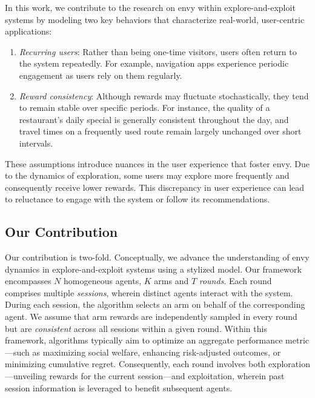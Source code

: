 In this work, we contribute to the research on envy within explore-and-exploit systems by modeling two key behaviors that characterize real-world, user-centric applications:
\begin{enumerate}[wide, labelwidth=0pt, labelindent=0pt]
    \item \textit{Recurring users}: Rather than being one-time visitors, users often return to the system repeatedly. For example, navigation apps experience periodic engagement as users rely on them regularly.
    \item \textit{Reward consistency}: Although rewards may fluctuate stochastically, they tend to remain stable over specific periods. For instance, the quality of a restaurant’s daily special is generally consistent throughout the day, and travel times on a frequently used route remain largely unchanged over short intervals.
\end{enumerate}
These assumptions introduce nuances in the user experience that foster envy. Due to the dynamics of exploration, some users may explore more frequently and consequently receive lower rewards. This discrepancy in user experience can lead to reluctance to engage with the system or follow its recommendations.


\subsection{Our Contribution}
\label{sec: contribution}
Our contribution is two-fold. Conceptually, we advance the understanding of envy dynamics in explore-and-exploit systems using a stylized model. Our framework encompasses $N$ homogeneous agents, $K$ arms and $T$ \emph{rounds}. Each round comprises multiple \emph{sessions}, wherein distinct agents interact with the system. During each session, the algorithm selects an arm on behalf of the corresponding agent. We assume that arm rewards are independently sampled in every round but are \emph{consistent} across all sessions within a given round. Within this framework, algorithms typically aim to optimize an aggregate performance metric---such as maximizing social welfare, enhancing risk-adjusted outcomes, or minimizing cumulative regret. Consequently, each round involves both exploration---unveiling rewards for the current session---and exploitation, wherein past session information is leveraged to benefit subsequent agents. 

